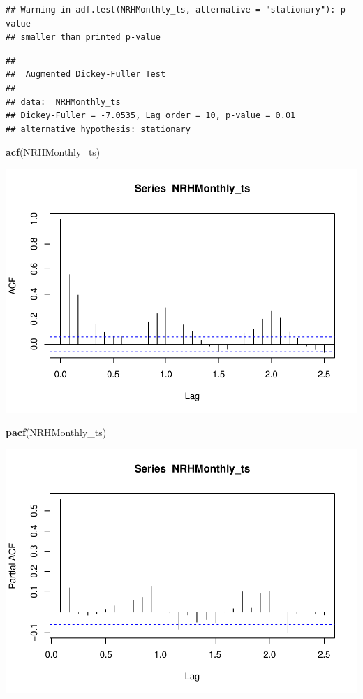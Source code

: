 \documentclass[12pt,]{article}
\newenvironment{Shaded}{\begin{snugshade}}{\end{snugshade}}
\newcommand{\KeywordTok}[1]{\textcolor[rgb]{0.13,0.29,0.53}{\textbf{#1}}}
\newcommand{\NormalTok}[1]{#1}
\begin{document}
\begin{verbatim}
## Warning in adf.test(NRHMonthly_ts, alternative = "stationary"): p-value
## smaller than printed p-value
\end{verbatim}

\begin{verbatim}
## 
##  Augmented Dickey-Fuller Test
## 
## data:  NRHMonthly_ts
## Dickey-Fuller = -7.0535, Lag order = 10, p-value = 0.01
## alternative hypothesis: stationary
\end{verbatim}

\begin{Shaded}
\begin{Highlighting}[]
\KeywordTok{acf}\NormalTok{(NRHMonthly_ts)}
\end{Highlighting}
\end{Shaded}

\includegraphics{Project_Template_files/figure-latex/unnamed-chunk-6-5.pdf}

\begin{Shaded}
\begin{Highlighting}[]
\KeywordTok{pacf}\NormalTok{(NRHMonthly_ts)}
\end{Highlighting}
\end{Shaded}

\includegraphics{Project_Template_files/figure-latex/unnamed-chunk-6-6.pdf}
\end{document}
